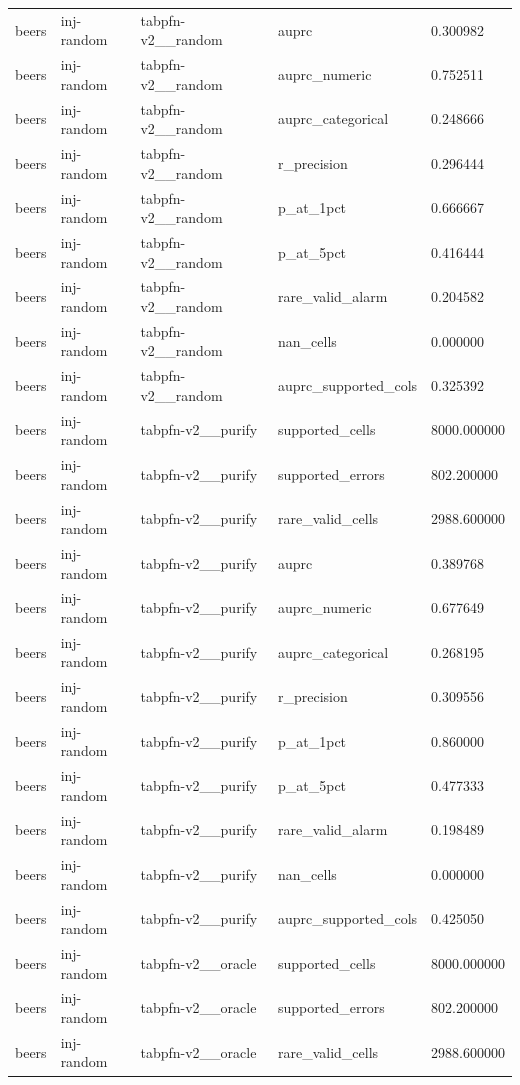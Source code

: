 \begin{tabular}{lllll}
beers & inj-random & tabpfn-v2\_\_random & auprc & 0.300982 \\
beers & inj-random & tabpfn-v2\_\_random & auprc\_numeric & 0.752511 \\
beers & inj-random & tabpfn-v2\_\_random & auprc\_categorical & 0.248666 \\
beers & inj-random & tabpfn-v2\_\_random & r\_precision & 0.296444 \\
beers & inj-random & tabpfn-v2\_\_random & p\_at\_1pct & 0.666667 \\
beers & inj-random & tabpfn-v2\_\_random & p\_at\_5pct & 0.416444 \\
beers & inj-random & tabpfn-v2\_\_random & rare\_valid\_alarm & 0.204582 \\
beers & inj-random & tabpfn-v2\_\_random & nan\_cells & 0.000000 \\
beers & inj-random & tabpfn-v2\_\_random & auprc\_supported\_cols & 0.325392 \\
beers & inj-random & tabpfn-v2\_\_purify & supported\_cells & 8000.000000 \\
beers & inj-random & tabpfn-v2\_\_purify & supported\_errors & 802.200000 \\
beers & inj-random & tabpfn-v2\_\_purify & rare\_valid\_cells & 2988.600000 \\
beers & inj-random & tabpfn-v2\_\_purify & auprc & 0.389768 \\
beers & inj-random & tabpfn-v2\_\_purify & auprc\_numeric & 0.677649 \\
beers & inj-random & tabpfn-v2\_\_purify & auprc\_categorical & 0.268195 \\
beers & inj-random & tabpfn-v2\_\_purify & r\_precision & 0.309556 \\
beers & inj-random & tabpfn-v2\_\_purify & p\_at\_1pct & 0.860000 \\
beers & inj-random & tabpfn-v2\_\_purify & p\_at\_5pct & 0.477333 \\
beers & inj-random & tabpfn-v2\_\_purify & rare\_valid\_alarm & 0.198489 \\
beers & inj-random & tabpfn-v2\_\_purify & nan\_cells & 0.000000 \\
beers & inj-random & tabpfn-v2\_\_purify & auprc\_supported\_cols & 0.425050 \\
beers & inj-random & tabpfn-v2\_\_oracle & supported\_cells & 8000.000000 \\
beers & inj-random & tabpfn-v2\_\_oracle & supported\_errors & 802.200000 \\
beers & inj-random & tabpfn-v2\_\_oracle & rare\_valid\_cells & 2988.600000 \\

\end{tabular}
